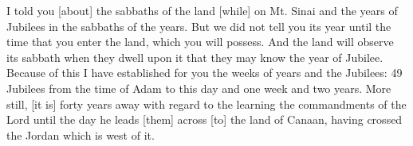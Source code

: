 \begin{translation}
    I told you [about] the sabbaths of the land [while] on Mt. Sinai and the years of
    Jubilees in the sabbaths of the years. But we did not tell you its year
    until the time that you enter the land, which you will possess.
    And the land will observe its sabbath when they dwell upon it
    that they may know the year of Jubilee.
    Because of this I have established for you
    the weeks of years and the Jubilees: 49 Jubilees
    from the time of Adam to this day and one week
    and two years. More still, [it is] forty years
    away with regard to the learning the commandments of the Lord until the day he leads [them]
    across [to] the land of Canaan, having crossed the Jordan which is west of it.
\end{translation}